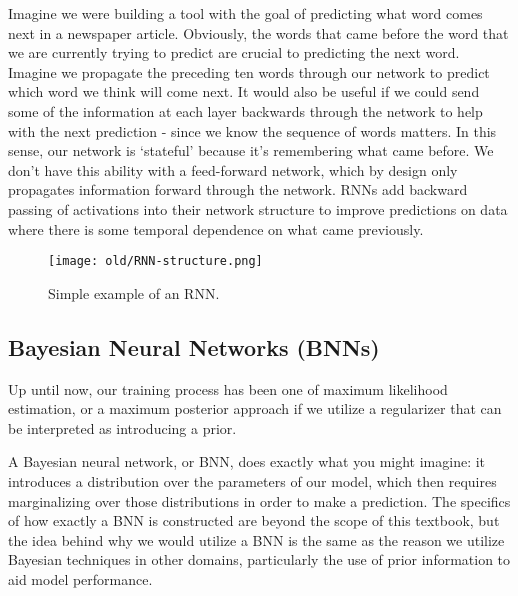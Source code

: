 Imagine we were building a tool with the goal of predicting what word comes next in a newspaper article. Obviously, the words that came before the word that we are currently trying to predict are crucial to predicting the next word. Imagine we propagate the preceding ten words through our network to predict which word we think will come next. It would also be useful if we could send some of the information at each layer backwards through the network to help with the next prediction - since we know the sequence of words matters. In this sense, our network is `stateful' because it's remembering what came before. We don't have this ability with a feed-forward network, which by design only propagates information forward through the network. RNNs add backward passing of activations into their network structure to improve predictions on data where there is some temporal dependence on what came previously.

\begin{figure}
    \centering
    \texttt{[image: old/RNN-structure.png]}
    \caption{Simple example of an RNN.}
    \label{fig:RNN-structre}
\end{figure}


\subsection{Bayesian Neural Networks (BNNs)}
Up until now, our training process has been one of maximum likelihood estimation, or a maximum posterior approach if we utilize a regularizer that can be interpreted as introducing a prior.

A Bayesian neural network, or BNN, does exactly what you might imagine: it introduces a distribution over the parameters of our model, which then requires marginalizing over those distributions in order to make a prediction. The specifics of how exactly a BNN is constructed are beyond the scope of this textbook, but the idea behind why we would utilize a BNN is the same as the reason we utilize Bayesian techniques in other domains, particularly the use of prior information to aid model performance.
